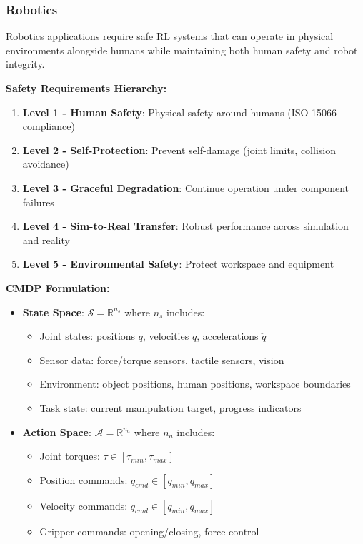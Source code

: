 \documentclass[12pt]{article}
\begin{document}
{{{{\subsubsection{Robotics}

Robotics applications require safe RL systems that can operate in physical environments alongside humans while maintaining both human safety and robot integrity.

\textbf{Safety Requirements Hierarchy:}
\begin{enumerate}
\item \textbf{Level 1 - Human Safety}: Physical safety around humans (ISO 15066 compliance)
\item \textbf{Level 2 - Self-Protection}: Prevent self-damage (joint limits, collision avoidance)
\item \textbf{Level 3 - Graceful Degradation}: Continue operation under component failures
\item \textbf{Level 4 - Sim-to-Real Transfer}: Robust performance across simulation and reality
\item \textbf{Level 5 - Environmental Safety}: Protect workspace and equipment
\end{enumerate}

\textbf{CMDP Formulation:}
\begin{itemize}
\item \textbf{State Space}: $\mathcal{S} = \mathbb{R}^{n_s}$ where $n_s$ includes:
\begin{itemize}
\item Joint states: positions $q$, velocities $\dot{q}$, accelerations $\ddot{q}$
\item Sensor data: force/torque sensors, tactile sensors, vision
\item Environment: object positions, human positions, workspace boundaries
\item Task state: current manipulation target, progress indicators
\end{itemize}

\item \textbf{Action Space}: $\mathcal{A} = \mathbb{R}^{n_a}$ where $n_a$ includes:
\begin{itemize}
\item Joint torques: $\tau \in [\tau_{min}, \tau_{max}]$
\item Position commands: $q_{cmd} \in [q_{min}, q_{max}]$
\item Velocity commands: $\dot{q}_{cmd} \in [\dot{q}_{min}, \dot{q}_{max}]$
\item Gripper commands: opening/closing, force control
\end{itemize}


\end{itemize}}}}}
\end{document}
